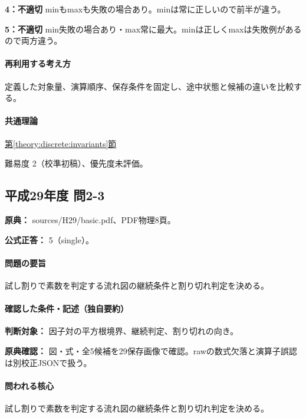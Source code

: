 \noindent\textbf{4：不適切} minもmaxも失敗の場合あり。minは常に正しいので前半が違う。\par

\noindent\textbf{5：不適切} min失敗の場合あり・max常に最大。minは正しくmaxは失敗例があるので両方違う。\par

\paragraph{再利用する考え方} 定義した対象量、演算順序、保存条件を固定し、途中状態と候補の違いを比較する。

\paragraph{共通理論} \hyperref[theory:discrete:invariants]{第\ref*{theory:discrete:invariants}節}

\par 難易度 2（校準初稿）、優先度未評価。

\subsection{平成29年度 問2-3}
\label{q:h29-reg-basic-2-3}

\noindent\textbf{原典：} sources/H29/basic.pdf、PDF物理8頁。

\textbf{公式正答：} 5（single）。

\paragraph{問題の要旨} 試し割りで素数を判定する流れ図の継続条件と割り切れ判定を決める。

\paragraph{確認した条件・記述（独自要約）}\mbox{}\par

\noindent\textbf{判断対象：} 因子対の平方根境界、継続判定、割り切れの向き。\par

\noindent\textbf{原典確認：} 図・式・全5候補を29保存画像で確認。rawの数式欠落と演算子誤認は別校正JSONで扱う。\par

\paragraph{問われる核心} 試し割りで素数を判定する流れ図の継続条件と割り切れ判定を決める。


